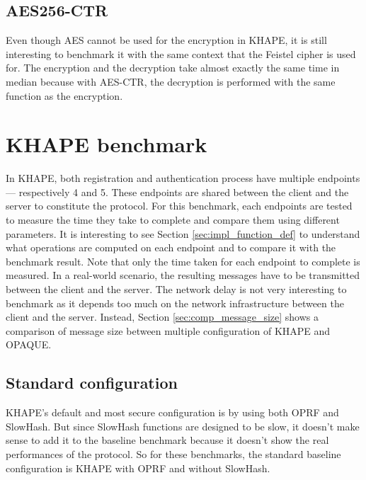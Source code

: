 ﻿\documentclass[../report.tex]{subfiles}
\begin{document}
\subsection*{AES256-CTR}
Even though AES cannot be used for the encryption in KHAPE, it is still interesting to benchmark it with the same context that the Feistel cipher is used for.
The encryption and the decryption take almost exactly the same time in median because with AES-CTR, the decryption is performed with the same function as the encryption.


\section{KHAPE benchmark} %
In KHAPE, both registration and authentication process have multiple endpoints --- respectively 4 and 5. These endpoints are shared between the client and the server to constitute the protocol.
For this benchmark, each endpoints are tested to measure the time they take to complete and compare them using different parameters. 
It is interesting to see Section \ref{sec:impl_function_def} to understand what operations are computed on each endpoint and to compare it with the benchmark result.
Note that only the time taken for each endpoint to complete is measured. In a real-world scenario, the resulting messages have to be transmitted between the client and the server. The network delay is not very interesting to benchmark as it depends too much on the network infrastructure between the client and the server. Instead, Section \ref{sec:comp_message_size} shows a comparison of message size between multiple configuration of KHAPE and OPAQUE.
\subsection{Standard configuration}
KHAPE's default and most secure configuration is by using both OPRF and SlowHash. 
But since SlowHash functions are designed to be slow, it doesn't make sense to add it to the baseline benchmark because it doesn't show the real performances of the protocol.
So for these benchmarks, the standard baseline configuration is KHAPE with OPRF and without SlowHash.
\pgfplotsset{width=\textwidth-1.1cm}
\end{document}
